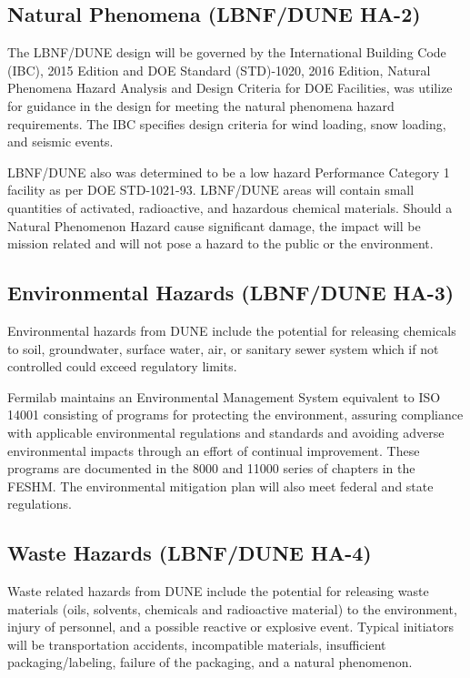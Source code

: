 \subsection{Natural Phenomena (LBNF/DUNE HA-2)}

The LBNF/DUNE design will be governed by the International Building
Code (IBC), 2015 Edition and DOE Standard (STD)-1020, 2016 Edition,
Natural Phenomena Hazard Analysis and Design Criteria for DOE
Facilities, was utilize for guidance in the design for meeting the
natural phenomena hazard requirements.  The IBC specifies design
criteria for wind loading, snow loading, and seismic events.

LBNF/DUNE also was determined to be a low hazard Performance Category
1 facility as per DOE STD-1021-93. LBNF/DUNE areas will contain small
quantities of activated, radioactive, and hazardous chemical
materials. Should a Natural Phenomenon Hazard cause significant
damage, the impact will be mission related and will not pose a hazard
to the public or the environment.

\subsection{Environmental Hazards (LBNF/DUNE HA-3)}

Environmental hazards from DUNE include the potential for releasing
chemicals to soil, groundwater, surface water, air, or sanitary sewer
system which if not controlled could exceed regulatory limits.

Fermilab maintains an Environmental Management System equivalent to
ISO 14001 consisting of programs for protecting the environment,
assuring compliance with applicable environmental regulations and
standards and avoiding adverse environmental impacts through an effort
of continual improvement.  These programs are documented in the 8000
and 11000 series of chapters in the FESHM.  The environmental
mitigation plan will also meet federal and state regulations.


\subsection{Waste Hazards (LBNF/DUNE HA-4)}

Waste related hazards from DUNE include the potential for releasing
waste materials (oils, solvents, chemicals and radioactive material)
to the environment, injury of personnel, and a possible reactive or
explosive event. Typical initiators will be transportation accidents,
incompatible materials, insufficient packaging/labeling, failure of
the packaging, and a natural phenomenon.

